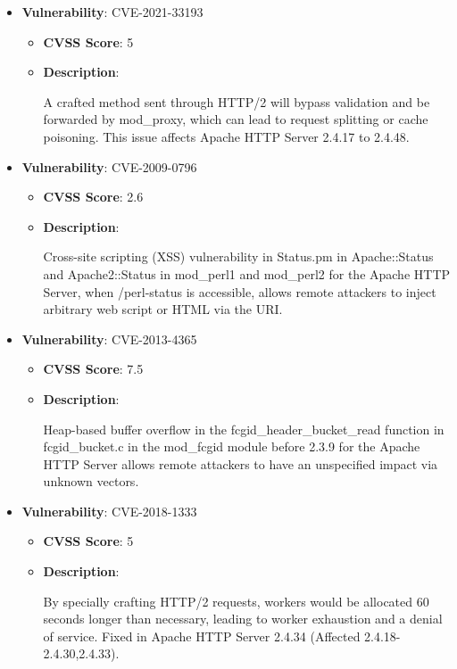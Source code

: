 \documentclass{article}
\begin{document}
\begin{itemize}
        \item \textbf{Vulnerability}: CVE-2021-33193
        \begin{itemize}
            \item \textbf{CVSS Score}:  5 
            \item \textbf{Description}:
            \parbox[t]{0.9\linewidth}{
                \ttfamily A crafted method sent through HTTP/2 will bypass validation and be forwarded by mod\_proxy, which can lead to request splitting or cache poisoning. This issue affects Apache HTTP Server 2.4.17 to 2.4.48.
            }
        \end{itemize}
    
        \item \textbf{Vulnerability}: CVE-2009-0796
        \begin{itemize}
            \item \textbf{CVSS Score}:  2.6 
            \item \textbf{Description}:
            \parbox[t]{0.9\linewidth}{
                \ttfamily Cross-site scripting (XSS) vulnerability in Status.pm in Apache::Status and Apache2::Status in mod\_perl1 and mod\_perl2 for the Apache HTTP Server, when /perl-status is accessible, allows remote attackers to inject arbitrary web script or HTML via the URI.
            }
        \end{itemize}
    
        \item \textbf{Vulnerability}: CVE-2013-4365
        \begin{itemize}
            \item \textbf{CVSS Score}:  7.5 
            \item \textbf{Description}:
            \parbox[t]{0.9\linewidth}{
                \ttfamily Heap-based buffer overflow in the fcgid\_header\_bucket\_read function in fcgid\_bucket.c in the mod\_fcgid module before 2.3.9 for the Apache HTTP Server allows remote attackers to have an unspecified impact via unknown vectors.
            }
        \end{itemize}
    
        \item \textbf{Vulnerability}: CVE-2018-1333
        \begin{itemize}
            \item \textbf{CVSS Score}:  5 
            \item \textbf{Description}:
            \parbox[t]{0.9\linewidth}{
                \ttfamily By specially crafting HTTP/2 requests, workers would be allocated 60 seconds longer than necessary, leading to worker exhaustion and a denial of service. Fixed in Apache HTTP Server 2.4.34 (Affected 2.4.18-2.4.30,2.4.33).
            }
        \end{itemize}
    

\end{itemize}
\end{document}
